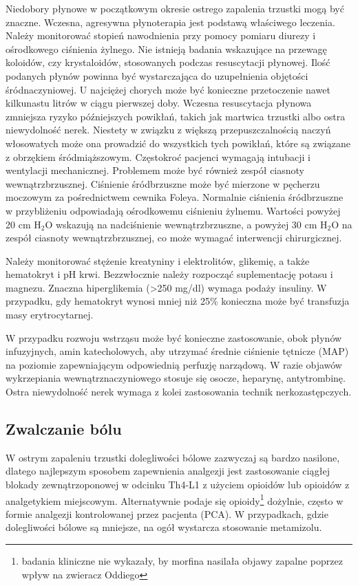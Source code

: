 \documentclass[a4paper, 12pt]{report}
\begin{document}
Niedobory płynowe w początkowym okresie ostrego zapalenia trzustki
mogą być znaczne. Wczesna, agresywna płynoterapia jest podstawą
właściwego leczenia. Należy monitorować stopień nawodnienia przy
pomocy pomiaru diurezy i ośrodkowego ciśnienia żylnego. Nie istnieją
badania wskazujące na przewagę koloidów, czy krystaloidów, stosowanych
podczas resuscytacji płynowej. Ilość podanych płynów powinna być
wystarczająca do uzupełnienia objętości śródnaczyniowej. U najciężej
chorych może być konieczne przetoczenie nawet kilkunastu litrów w
ciągu pierwszej doby. Wczesna resuscytacja płynowa zmniejsza ryzyko
późniejszych powikłań, takich jak martwica trzustki albo ostra
niewydolność nerek. Niestety w związku z większą przepuszczalnością
naczyń włosowatych może ona prowadzić do wszystkich tych powikłań,
które są związane z obrzękiem śródmiąższowym. Częstokroć pacjenci
wymagają intubacji i wentylacji mechanicznej. Problemem może być
również zespół ciasnoty wewnątrzbrzusznej. Ciśnienie śródbrzuszne może
być mierzone w pęcherzu moczowym za pośrednictwem cewnika
Foleya. Normalnie ciśnienia śródbrzuszne w przybliżeniu odpowiadają
ośrodkowemu ciśnieniu żylnemu. Wartości powyżej 20 cm H$_2$O wskazują
na nadciśnienie wewnątrzbrzuszne, a powyżej 30 cm H$_2$O na zespół
ciasnoty wewnątrzbrzusznej, co może wymagać interwencji chirurgicznej.

Należy monitorować stężenie kreatyniny i elektrolitów, glikemię, a
także hematokryt i pH krwi. Bezzwłocznie należy rozpocząć
suplementację potasu i magnezu. Znaczna hiperglikemia (>250 mg/dl) wymaga podaży
insuliny. W przypadku, gdy hematokryt wynosi mniej niż 25\% konieczna
może być transfuzja masy erytrocytarnej.

W przypadku rozwoju wstrząsu może być konieczne zastosowanie, obok
płynów infuzyjnych, amin katecholowych, aby utrzymać średnie ciśnienie
tętnicze (MAP) na poziomie zapewniającym odpowiednią perfuzję
narządową. W razie objawów wykrzepiania wewnątrznaczyniowego stosuje
się osocze, heparynę, antytrombinę. Ostra niewydolność nerek wymaga z
kolei zastosowania technik nerkozastępczych.

\subsection{Zwalczanie bólu}

W ostrym zapaleniu trzustki dolegliwości bólowe zazwyczaj są bardzo
nasilone, dlatego najlepszym sposobem zapewnienia analgezji jest
zastosowanie ciągłej blokady zewnątrzoponowej w odcinku Th4-L1 z
użyciem opioidów lub opioidów z analgetykiem miejscowym. Alternatywnie
podaje się opioidy\footnote{badania kliniczne nie wykazały, by morfina
  nasilała objawy zapalne poprzez wpływ na zwieracz Oddiego} dożylnie,
często w formie analgezji kontrolowanej przez pacjenta (PCA). W
przypadkach, gdzie dolegliwości bólowe są mniejsze, na ogół wystarcza
stosowanie metamizolu.
\end{document}
